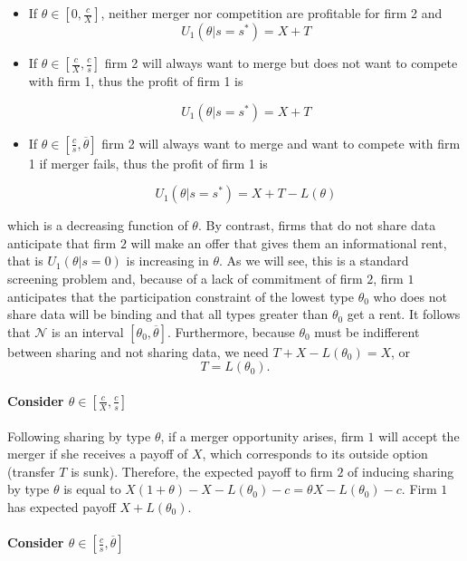 \documentclass[a4paper]{article}
\newcommand{\N}{\mathcal N}
\renewcommand{\t}{\theta}
\begin{document}
\begin{itemize}
    \item If $\t\in[0,\frac{c}{X}]$, neither merger nor competition are profitable for firm 2 and
    \[U_1(\t|s=s^*)=X+T\]
    \item If $\t\in[\frac{c}{X},\frac{c}{s}]$ firm 2 will always want to merge but does not want to compete with firm 1, thus the profit of firm 1 is
    
    \[U_1(\t|s=s^*)=X+T\]
    \item If $\t\in[\frac{c}{s},\overline \t]$ firm 2 will always want to merge and want to compete with firm 1 if merger fails, thus the profit of firm 1 is
    
    \[U_1(\t|s=s^*)=X+T-L(\t)\]
\end{itemize}

%

which is a decreasing function of $\t$. By contrast, firms that do not share data anticipate that firm $2$ will make an offer that gives them an informational rent, that is $U_1(\t|s=0)$ is increasing in $\t$. As we will see, this is a standard screening problem and, because of a lack of commitment of firm $2$, firm $1$ anticipates that the participation constraint of the lowest type $\t_0$ who does not share data will be binding and that all types greater than $\t_0$ get a rent. It follows that $\N$ is an interval $[\theta_0,\overline \t]$. Furthermore, because $\t_0$ must be indifferent between sharing and not sharing data, we need $T+X-L(\t_0)=X$, or
\begin{equation}\label{eq:T}
  T=L(\t_0).
\end{equation}
%

\paragraph{Consider $\t\in[\frac{c}{X},\frac{c}{s}]$}


Following sharing by type $\t$, if a merger opportunity arises, firm $1$ will accept the merger if she receives a payoff of $X$, which corresponds to its outside option (transfer $T$ is sunk). Therefore, the expected payoff to firm $2$ of inducing sharing by type $\t$ is equal to $X(1+\t)-X-L(\t_0)-c=\t X-L(\t_0)-c$. Firm $1$ has expected payoff $X+L(\t_0)$.


\paragraph{Consider $\t\in[\frac{c}{s},\overline \t]$}
\end{document}
